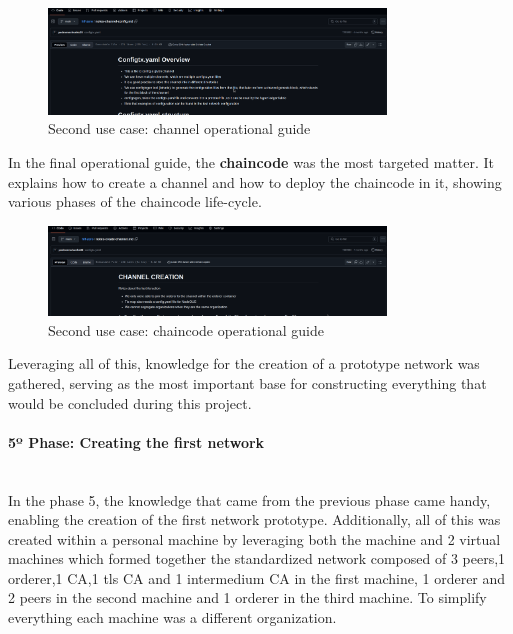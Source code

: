\begin{figure}[H]
    \centering
    \includegraphics[width=0.8\textwidth]{assets/use-case-2/notes-channel.png} %
    \caption{Second use case: channel operational guide}
    \label{fig:sample-image} 
\end{figure}

In the final operational guide, the \textbf{chaincode} was the most targeted matter.  It explains how to create a channel and how to deploy the chaincode in it, showing various phases of the chaincode life-cycle.

\begin{figure}[H]
    \centering
    \includegraphics[width=0.8\textwidth]{assets/use-case-2/notes-channel-and-chaincode.png} %
    \caption{Second use case: chaincode operational guide}
    \label{fig:sample-image} 
\end{figure}

Leveraging all of this, knowledge for the creation of a prototype network was gathered, serving as the most important base for constructing everything that would be concluded during this project.

\paragraph{5º Phase: Creating the first network}\mbox{}\\

In the phase 5, the knowledge that came from the previous phase came handy, enabling the creation of the first network prototype. Additionally, all of this was created within a personal machine by leveraging both the machine and 2 virtual machines which formed together the standardized network composed of 3 peers,1 orderer,1 CA,1 tls CA and 1 intermedium CA in the first machine, 1 orderer and 2 peers in the second machine and 1 orderer in the third machine. To simplify everything each machine was a different organization.

